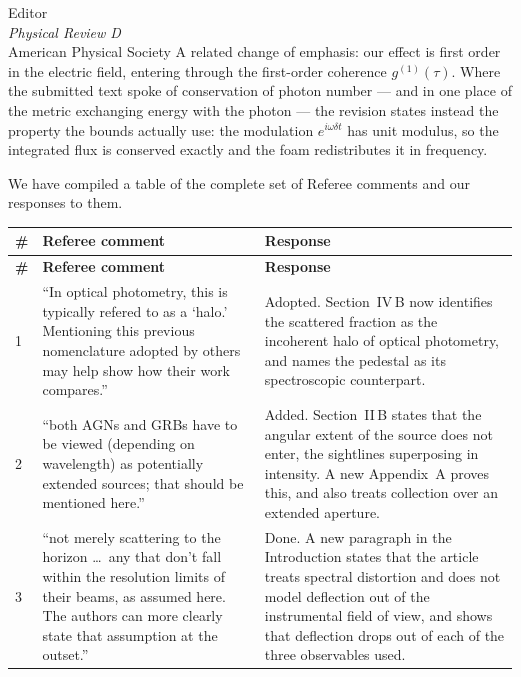 \documentclass[12pt]{letter}
\begin{document}
\begin{letter}{Editor\\
\textit{Physical Review D}\\
American Physical Society}
A related change of emphasis: our effect is first order in the electric
field, entering through the first-order coherence $g^{(1)}(\tau)$.  Where the
submitted text spoke of conservation of photon number --- and in one place of
the metric exchanging energy with the photon --- the revision states instead
the property the bounds actually use: the modulation $e^{i\omega\delta t}$
has unit modulus, so the integrated flux is conserved exactly and the foam
redistributes it in frequency.

We have compiled a table of the complete set of Referee comments and our
responses to them.

\medskip

\begin{longtable}{@{}p{}p{}p{}@{}}
\hline
\textbf{\#} & \textbf{Referee comment} & \textbf{Response} \\
\hline
\endfirsthead
\hline
\textbf{\#} & \textbf{Referee comment} & \textbf{Response} \\
\hline
\endhead

1 & ``In optical photometry, this is typically refered to as a `halo.'
Mentioning this previous nomenclature adopted by others may help show how
their work compares.''
& Adopted.  Section~IV\,B now identifies the scattered fraction as the
incoherent halo of optical photometry, and names the pedestal as its
spectroscopic counterpart. \\[2ex]

2 & ``both AGNs and GRBs have to be viewed (depending on wavelength) as
potentially extended sources; that should be mentioned here.''
& Added.  Section~II\,B states that the angular extent of the source does not
enter, the sightlines superposing in intensity.  A new Appendix~A proves
this, and also treats collection over an extended aperture. \\[2ex]

3 & ``not merely scattering to the horizon \ldots\ any that don't fall within
the resolution limits of their beams, as assumed here.  The authors can more
clearly state that assumption at the outset.''
& Done.  A new paragraph in the Introduction states that the article treats
spectral distortion and does not model deflection out of the instrumental
field of view, and shows that deflection drops out of each of the three
observables used. \\[2ex]


\end{longtable}
\end{letter}
\end{document}

